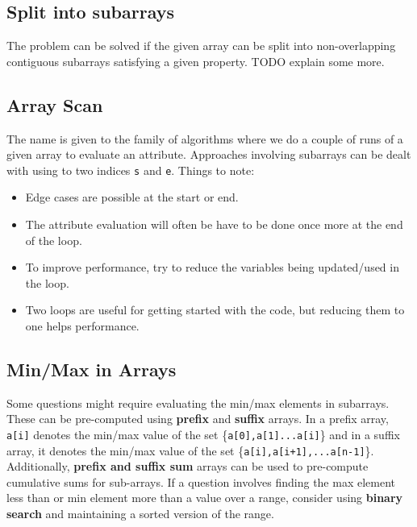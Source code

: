\documentclass{article}
\begin{document}
\subsection{Split into subarrays}
The problem can be solved if the given array can be split into non-overlapping contiguous subarrays satisfying a given property.
TODO explain some more. 
\subsection{Array Scan}
The name is given to the family of algorithms where we do a couple of runs of a given array to evaluate an attribute. Approaches involving subarrays can be dealt with using to two indices \texttt{s} and \texttt{e}. Things to note:
\begin{itemize}
    \item Edge cases are possible at the start or end.
    \item The attribute evaluation will often be have to be done once more at the end of the loop.
    \item To improve performance, try to reduce the variables being updated/used in the loop.
    \item Two loops are useful for getting started with the code, but reducing them to one helps performance.
\end{itemize}
\subsection{Min/Max in Arrays}
Some questions might require evaluating the min/max elements in subarrays. These can be pre-computed using
\textbf{prefix} and \textbf{suffix} arrays. In a prefix array, \texttt{a[i]} denotes the min/max value
of the set \{\texttt{a[0],a[1]...a[i]}\} and in a suffix array, it denotes the min/max value
of the set \{\texttt{a[i],a[i+1],...a[n-1]}\}. Additionally, \textbf{prefix and suffix sum} arrays
can be used to pre-compute cumulative sums for sub-arrays. If a question involves finding
the max element less than or min element more than a value over a range, consider using 
\textbf{binary search} and maintaining a sorted version of the range.
\end{document}
